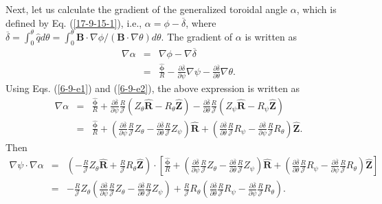 \documentclass{article}
\newcommand{\tmmathbf}[1]{\ensuremath{\boldsymbol{#1}}}
\begin{document}
Next, let us calculate the gradient of the generalized toroidal angle
$\alpha$, which is defined by Eq. (\ref{17-9-15-1}), i.e., $\alpha = \phi -
\overline{\delta}$, where $\overline{\delta} = \int_0^{\theta} \hat{q} d
\theta = \int_0^{\theta} \mathbf{B} \cdot \nabla \phi / \left( \mathbf{B}
\cdot \nabla \theta \right) d \theta$. The gradient of $\alpha$ is written as
\begin{eqnarray}
  \nabla \alpha & = & \nabla \phi - \nabla \overline{\delta} \nonumber\\
  & = & \frac{\hat{\tmmathbf{\phi}}}{R} - \frac{\partial
  \overline{\delta}}{\partial \psi} \nabla \psi - \frac{\partial
  \overline{\delta}}{\partial \theta} \nabla \theta . 
\end{eqnarray}
Using Eqs. (\ref{6-9-e1}) and (\ref{6-9-e2}), the above expression is written
as
\begin{eqnarray}
  \nabla \alpha & = & \frac{\hat{\tmmathbf{\phi}}}{R} + \frac{\partial
  \overline{\delta}}{\partial \psi} \frac{R}{\mathcal{J}} (Z_{\theta}
  \hat{\mathbf{R}} - R_{\theta} \hat{\mathbf{Z}}) - \frac{\partial
  \overline{\delta}}{\partial \theta} \frac{R}{\mathcal{J}} (Z_{\psi}
  \hat{\mathbf{R}} - R_{\psi} \hat{\mathbf{Z}}) \nonumber\\
  & = & \frac{\hat{\tmmathbf{\phi}}}{R} + \left( \frac{\partial
  \overline{\delta}}{\partial \psi} \frac{R}{\mathcal{J}} Z_{\theta} -
  \frac{\partial \overline{\delta}}{\partial \theta} \frac{R}{\mathcal{J}}
  Z_{\psi} \right) \hat{\mathbf{R}} + \left( \frac{\partial
  \overline{\delta}}{\partial \theta} \frac{R}{\mathcal{J}} R_{\psi} -
  \frac{\partial \overline{\delta}}{\partial \psi} \frac{R}{\mathcal{J}}
  R_{\theta} \right) \hat{\mathbf{Z}} . 
\end{eqnarray}
Then
\begin{eqnarray}
  \nabla \psi \cdot \nabla \alpha & = & \left( - \frac{R}{\mathcal{J}}
  Z_{\theta} \hat{\mathbf{R}} + \frac{R}{\mathcal{J}} R_{\theta}
  \hat{\mathbf{Z}} \right) \cdot \left[ \frac{\hat{\tmmathbf{\phi}}}{R} +
  \left( \frac{\partial \overline{\delta}}{\partial \psi}
  \frac{R}{\mathcal{J}} Z_{\theta} - \frac{\partial
  \overline{\delta}}{\partial \theta} \frac{R}{\mathcal{J}} Z_{\psi} \right)
  \hat{\mathbf{R}} + \left( \frac{\partial \overline{\delta}}{\partial \theta}
  \frac{R}{\mathcal{J}} R_{\psi} - \frac{\partial \overline{\delta}}{\partial
  \psi} \frac{R}{\mathcal{J}} R_{\theta} \right) \hat{\mathbf{Z}} \right]
  \nonumber\\
  & = & - \frac{R}{\mathcal{J}} Z_{\theta} \left( \frac{\partial
  \overline{\delta}}{\partial \psi} \frac{R}{\mathcal{J}} Z_{\theta} -
  \frac{\partial \overline{\delta}}{\partial \theta} \frac{R}{\mathcal{J}}
  Z_{\psi} \right) + \frac{R}{\mathcal{J}} R_{\theta} \left( \frac{\partial
  \overline{\delta}}{\partial \theta} \frac{R}{\mathcal{J}} R_{\psi} -
  \frac{\partial \overline{\delta}}{\partial \psi} \frac{R}{\mathcal{J}}
  R_{\theta} \right) . 
\end{eqnarray}
\end{document}

